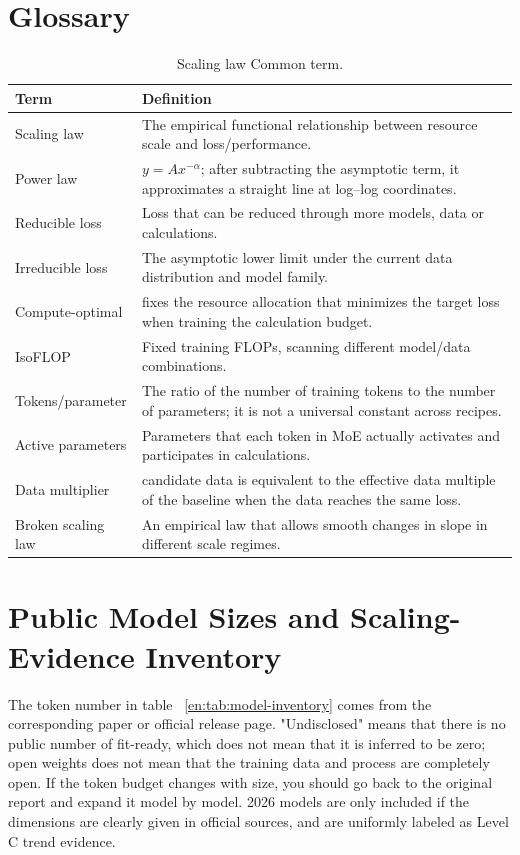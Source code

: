 \documentclass[UTF8,10pt,a4paper,fontset=none]{ctexart}
\def\BilingualAnchorPrefix{en}
\let\BilingualOriginalAppendix\appendix
\renewcommand{\appendix}{%
  \BilingualOriginalAppendix
  \renewcommand*{\theHsection}{\BilingualAnchorPrefix.appendix.\Alph{section}}%
}
\begin{document}
\appendix
\clearpage
\section{Glossary}
\label{en:app:glossary}

\begin{table}[htbp]
\centering
\caption{Scaling law Common term. }\label{en:tab:glossary}
\begin{tabularx}{\textwidth}{p{3.6cm}X}
\toprule
Term & Definition \\
\midrule
Scaling law & The empirical functional relationship between resource scale and loss/performance. \\
Power law & $y=A x^{-\alpha}$; after subtracting the asymptotic term, it approximates a straight line at log--log coordinates. \\
Reducible loss & Loss that can be reduced through more models, data or calculations. \\
Irreducible loss & The asymptotic lower limit under the current data distribution and model family. \\
Compute-optimal & fixes the resource allocation that minimizes the target loss when training the calculation budget. \\
IsoFLOP & Fixed training FLOPs, scanning different model/data combinations. \\
Tokens/parameter & The ratio of the number of training tokens to the number of parameters; it is not a universal constant across recipes. \\
Active parameters & Parameters that each token in MoE actually activates and participates in calculations. \\
Data multiplier & candidate data is equivalent to the effective data multiple of the baseline when the data reaches the same loss. \\
Broken scaling law & An empirical law that allows smooth changes in slope in different scale regimes. \\
\bottomrule
\end{tabularx}
\end{table}

\section{Public Model Sizes and Scaling-Evidence Inventory}
\label{en:app:model-inventory}

The token number in table ~\ref{en:tab:model-inventory} comes from the corresponding paper or official release page. "Undisclosed" means that there is no public number of fit-ready, which does not mean that it is inferred to be zero; open weights does not mean that the training data and process are completely open. If the token budget changes with size, you should go back to the original report and expand it model by model. 2026 models are only included if the dimensions are clearly given in official sources, and are uniformly labeled as Level C trend evidence.
\end{document}
